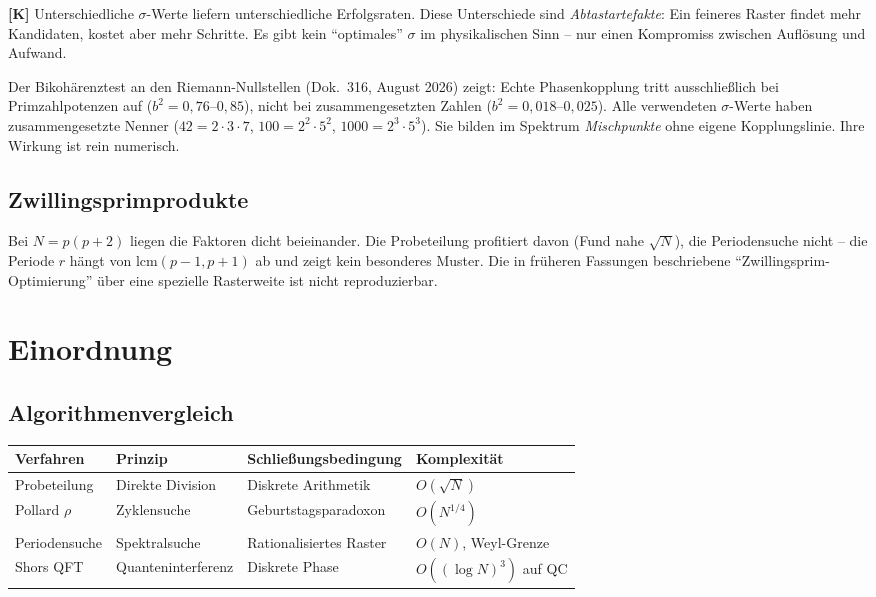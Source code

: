 \textbf{[K]} Unterschiedliche $\sigma$-Werte liefern unterschiedliche
Erfolgsraten. Diese Unterschiede sind \emph{Abtastartefakte}: Ein feineres
Raster findet mehr Kandidaten, kostet aber mehr Schritte. Es gibt kein
\enquote{optimales} $\sigma$ im physikalischen Sinn -- nur einen Kompromiss
zwischen Auflösung und Aufwand.

\begin{keyresult}
Der Bikohärenztest an den Riemann-Nullstellen (Dok.~316, August 2026) zeigt:
Echte Phasenkopplung tritt ausschließlich bei Primzahlpotenzen auf
($b^2 = 0{,}76$--$0{,}85$), nicht bei zusammengesetzten Zahlen
($b^2 = 0{,}018$--$0{,}025$). Alle verwendeten $\sigma$-Werte haben
zusammengesetzte Nenner ($42 = 2\cdot3\cdot7$, $100 = 2^2\cdot5^2$,
$1000 = 2^3\cdot5^3$). Sie bilden im Spektrum \emph{Mischpunkte} ohne eigene
Kopplungslinie. Ihre Wirkung ist rein numerisch.
\end{keyresult}

\subsection{Zwillingsprimprodukte}

Bei $N = p(p+2)$ liegen die Faktoren dicht beieinander. Die Probeteilung
profitiert davon (Fund nahe $\sqrt{N}$), die Periodensuche nicht -- die
Periode $r$ hängt von $\mathrm{lcm}(p-1,p+1)$ ab und zeigt kein besonderes
Muster. Die in früheren Fassungen beschriebene \enquote{Zwillingsprim-Optimierung}
über eine spezielle Rasterweite ist nicht reproduzierbar.

\section{Einordnung}

\subsection{Algorithmenvergleich}

\begin{center}
\begin{tabular}{llll}
\toprule
Verfahren & Prinzip & Schließungsbedingung & Komplexität \\
\midrule
Probeteilung & Direkte Division & Diskrete Arithmetik & $O(\sqrt{N})$ \\
Pollard $\rho$ & Zyklensuche & Geburtstagsparadoxon & $O(N^{1/4})$ \\
Periodensuche & Spektralsuche & Rationalisiertes Raster & $O(N)$, Weyl-Grenze \\
Shors QFT & Quanteninterferenz & Diskrete Phase & $O((\log N)^3)$ auf QC \\
\bottomrule
\end{tabular}
\end{center}

